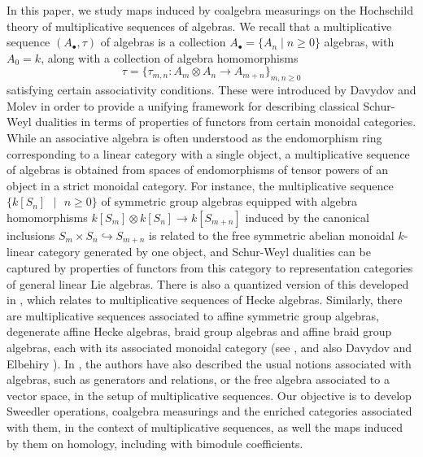 \documentclass[10pt, colorlinks]{article}
\numberwithin{equation}{section} \DeclareMathSizes{2}{10}{12}{13}
\begin{document}
\smallskip
In this paper, we  study maps induced by coalgebra measurings on the Hochschild theory of multiplicative sequences of algebras. We recall that a multiplicative sequence  $({A}_\bullet,\tau)$  of algebras is a collection   ${A}_\bullet=\{A_n \mid n \ge 0\}$  algebras, with $A_0=k$, along with a collection of algebra homomorphisms
\begin{equation}\label{1.3eef}
  \tau=\{\tau_{m,n}: A_m \otimes A_n \longrightarrow A_{m+n}\}_{m,n\geq 0}
\end{equation}   satisfying certain associativity conditions. These were introduced by Davydov and Molev \cite{DAV} in order to provide a unifying framework for describing classical Schur-Weyl dualities in terms of properties of functors from certain monoidal categories. While an associative algebra is often understood as the endomorphism ring corresponding to a linear category with a single object, a multiplicative sequence of algebras is obtained from spaces of endomorphisms of tensor powers of an object in a strict monoidal category. For instance, the multiplicative sequence $\{\mbox{$k[S_n]$ $\vert$ $n\geq 0$}\}$ of symmetric group algebras equipped with algebra homomorphisms $k[S_m]\otimes k[S_n]\longrightarrow k[S_{m+n}]$ induced by the canonical inclusions $S_m\times S_n\hookrightarrow S_{m+n}$ is related to the free symmetric abelian monoidal $k$-linear category generated by one object, and Schur-Weyl dualities can be captured by properties of functors from this category to representation categories of general linear Lie algebras. There is also a quantized version of this developed in \cite{DAV}, which relates to multiplicative sequences of Hecke algebras. Similarly, there are multiplicative sequences associated to affine symmetric group algebras, degenerate affine Hecke algebras, braid group algebras and affine braid group algebras, each with its associated monoidal category (see \cite{DAV},  and also Davydov and Elbehiry \cite{DE}). In \cite{DAV}, the authors have also described the usual notions associated with algebras, such as generators and relations, or the free algebra associated to a vector space, in the setup of multiplicative sequences. Our objective is to develop Sweedler operations, coalgebra measurings and the enriched categories associated with them,   in the context of multiplicative sequences, as well the maps induced by them on homology, including with bimodule coefficients.  
\end{document}
